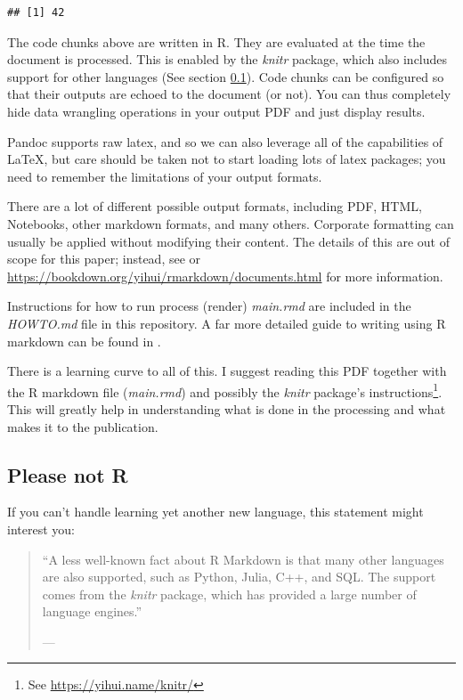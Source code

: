 \documentclass[11pt,]{article}
\let\rmarkdownfootnote\footnote%
\def\footnote{\protect\rmarkdownfootnote}
\begin{document}
\begin{verbatim}
## [1] 42
\end{verbatim}

The code chunks above are written in R. They are evaluated at the time the document is processed. This is enabled by the \emph{knitr} package, which also includes support for other languages (See section \ref{sec:pleaseNotR}). Code chunks can be configured so that their outputs are echoed to the document (or not). You can thus completely hide data wrangling operations in your output PDF and just display results.

Pandoc supports raw latex, and so we can also leverage all of the capabilities of LaTeX, but care should be taken not to start loading lots of latex packages; you need to remember the limitations of your output formats.

There are a lot of different possible output formats, including PDF, HTML, Notebooks, other markdown formats, and many others. Corporate formatting can usually be applied without modifying their content. The details of this are out of scope for this paper; instead, see \citet{R-Markdown-Guide} or \url{https://bookdown.org/yihui/rmarkdown/documents.html} for more information.

Instructions for how to run process (render) \emph{main.rmd} are included in the \emph{HOWTO.md} file in this repository. A far more detailed guide to writing using R markdown can be found in \citet{R-Markdown-Guide}.

There is a learning curve to all of this. I suggest reading this PDF together with the R markdown file (\emph{main.rmd}) and possibly the \emph{knitr} package's instructions\footnote{See \url{https://yihui.name/knitr/}}. This will greatly help in understanding what is done in the processing and what makes it to the publication.

\hypertarget{sec:pleaseNotR}{%
\subsection{Please not R}\label{sec:pleaseNotR}}

If you can't handle learning yet another new language, this statement might interest you:

\begin{quote}
``A less well-known fact about R Markdown is that many other languages are also supported, such as Python, Julia, C++, and SQL. The support comes from the \emph{knitr} package, which has provided a large number of language engines.''

--- \citet{R-Markdown-Guide}
\end{quote}
\end{document}

